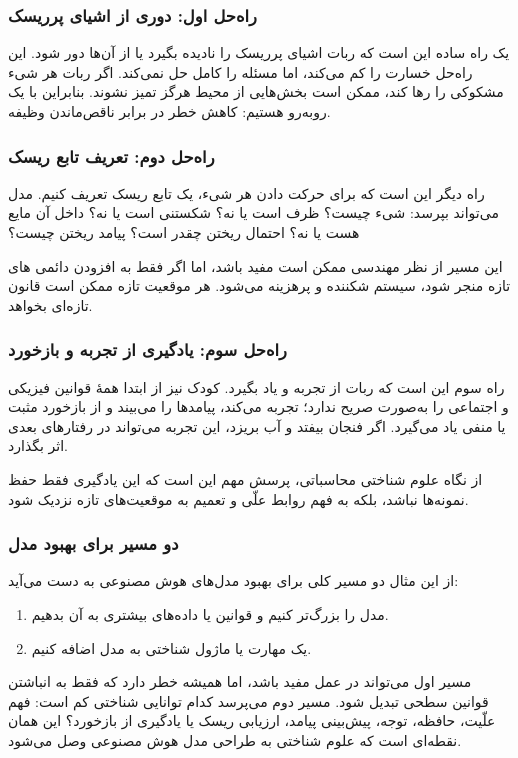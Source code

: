 \subsubsection{راه‌حل اول: دوری از اشیای پرریسک}
یک راه ساده این است که ربات اشیای پرریسک را نادیده بگیرد یا از آن‌ها دور شود. این راه‌حل خسارت را کم می‌کند، اما مسئله را کامل حل نمی‌کند. اگر ربات هر شیء مشکوکی را رها کند، ممکن است بخش‌هایی از محیط هرگز تمیز نشوند. بنابراین با یک  روبه‌رو هستیم: کاهش خطر در برابر ناقص‌ماندن وظیفه.

\subsubsection{راه‌حل دوم: تعریف تابع ریسک}
راه دیگر این است که برای حرکت دادن هر شیء، یک تابع ریسک تعریف کنیم. مدل می‌تواند بپرسد: شیء چیست؟ ظرف است یا نه؟ شکستنی است یا نه؟ داخل آن مایع هست یا نه؟ احتمال ریختن چقدر است؟ پیامد ریختن چیست؟

این مسیر از نظر مهندسی ممکن است مفید باشد، اما اگر فقط به افزودن دائمی های تازه منجر شود، سیستم شکننده و پرهزینه می‌شود. هر موقعیت تازه ممکن است قانون تازه‌ای بخواهد.

\subsubsection{راه‌حل سوم: یادگیری از تجربه و بازخورد}
راه سوم این است که ربات از تجربه و  یاد بگیرد. کودک نیز از ابتدا همهٔ قوانین فیزیکی و اجتماعی را به‌صورت صریح ندارد؛ تجربه می‌کند، پیامدها را می‌بیند و از بازخورد مثبت یا منفی یاد می‌گیرد. اگر فنجان بیفتد و آب بریزد، این تجربه می‌تواند در رفتارهای بعدی اثر بگذارد.

از نگاه علوم شناختی محاسباتی، پرسش مهم این است که این یادگیری فقط حفظ نمونه‌ها نباشد، بلکه به فهم روابط علّی و تعمیم به موقعیت‌های تازه نزدیک شود.

\subsubsection{دو مسیر برای بهبود مدل}
از این مثال دو مسیر کلی برای بهبود مدل‌های هوش مصنوعی به دست می‌آید:
\begin{enumerate}
  \item مدل را بزرگ‌تر کنیم و قوانین یا داده‌های بیشتری به آن بدهیم.
  \item یک مهارت یا ماژول شناختی به مدل اضافه کنیم.
\end{enumerate}

مسیر اول می‌تواند در عمل مفید باشد، اما همیشه خطر دارد که فقط به انباشتن قوانین سطحی تبدیل شود. مسیر دوم می‌پرسد کدام توانایی شناختی کم است: فهم علّیت، حافظه، توجه، پیش‌بینی پیامد، ارزیابی ریسک یا یادگیری از بازخورد؟ این همان نقطه‌ای است که علوم شناختی به طراحی مدل هوش مصنوعی وصل می‌شود.

